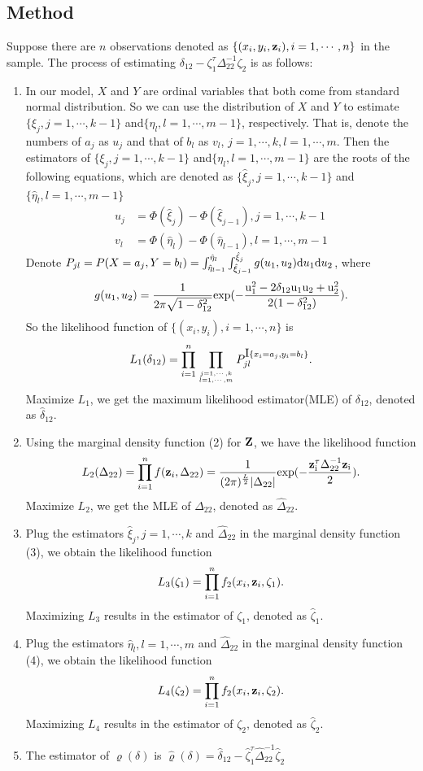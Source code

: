\documentclass[a4,11pt,epsf, amssymb]{article}
\begin{document}
\begin{CJK}{GBK}{song}
\subsection{Method}
Suppose there are $n$ observations denoted as $\{(x_i,y_i,{\bf z}_i),i=1,\cdots,n\}$ in the sample. The process of estimating $\delta_{12} - \zeta_1^\tau \Delta_{22}^{-1} \zeta_2 $ is as follows:
\begin{enumerate}
    \item In our model, $X$ and $Y$ are ordinal variables that both come from standard normal distribution. So we can use the distribution of $X$ and $Y$ to estimate $\{\xi_j,j=1,\cdots,k-1\}$ and$\{\eta_l,l=1,\cdots,m-1\}$, respectively. That is, denote the numbers of $a_j$ as $u_j$ and that of $b_l$ as $v_l$, $j = 1,\cdots,k,l=1,\cdots,m$. Then the estimators of $\{\xi_j,j=1,\cdots,k-1\}$ and$\{\eta_l,l=1,\cdots,m-1\}$ are the roots of the following equations, which are denoted as $\{\hat{\xi}_j,j=1,\cdots,k-1\}$ and$\{\hat{\eta}_l,l=1,\cdots,m-1\}$
        \begin{align*}
        u_j & = \Phi(\hat{\xi}_j) - \Phi(\hat{\xi}_{j-1}),j = 1,\cdots,k-1 \\
        v_l & = \Phi(\hat{\eta}_l) - \Phi(\hat{\eta}_{l-1}), l= 1, \cdots, m-1
        \end{align*}
        Denote $P_{jl} = P(X=a_j,Y=b_l) = \int_{\hat{\eta}_{l-1}}^{\hat{\eta}_l} \int_{\hat{\xi}_{j-1}}^{\hat{\xi}_j}g(u_1,u_2) \hbox{d}u_1 \hbox{d}u_2$, where
        $$g(u_1,u_2)=\frac 1{2\pi \sqrt{1-\delta_{12}^2}}\rm exp{(-\frac {u_1^2 - 2\delta_{12}u_1u_2 + u_2^2}{2(1-\delta_{12}^2)})}.$$
        So the likelihood function of $\{(x_i,y_i),i = 1,\cdots,n\}$ is
        $$L_1(\delta_{12}) = \prod_{i=1}^n \prod_{j=1,\cdots,k \atop l= 1,\cdots,m}P_{jl}^{\hbox {I}\{x_i = a_j, y_i = b_l\}}.$$
        Maximize $L_1$, we get the maximum likelihood estimator(MLE) of $\delta_{12}$, denoted as $\hat{\delta}_{12}.$
    \item Using the marginal density function (2) for ${\bf Z}$, we have the likelihood function
        $$L_2(\Delta_{22}) = \prod_{i=1}^n f({\bf z}_i,\Delta_{22}) = \frac 1{(2\pi)^{\frac L2}|\Delta_{22}|}\rm exp{(-\frac {{\bf z}_i^\tau \Delta_{22}^{-1}{\bf z}_i}{2})}.$$
        Maximize $L_2$, we get the MLE of $\Delta_{22}$, denoted as $\hat{\Delta}_{22}.$
    \item Plug the estimators $\hat{\xi}_j,j=1,\cdots,k$ and $\hat{\Delta}_{22}$ in the marginal density function (3), we obtain the likelihood function
        $$L_3(\zeta_1)=\prod_{i=1}^n f_2(x_i,{\bf z}_i,\zeta_1).$$
        Maximizing $L_3$ results in the estimator of $\zeta_1$, denoted as $\hat{\zeta}_1.$
    \item Plug the estimators $\hat{\eta}_l,l=1,\cdots,m$ and $\hat{\Delta}_{22}$ in the marginal density function (4), we obtain the likelihood function
        $$L_4(\zeta_2)=\prod_{i=1}^n f_2(x_i,{\bf z}_i,\zeta_2).$$
        Maximizing $L_4$ results in the estimator of $\zeta_2$, denoted as $\hat{\zeta}_2.$
    \item The estimator of $\varrho(\delta)$ is $\hat{\varrho}(\delta) = \hat{\delta}_{12} - \hat{\zeta}_1^\tau \hat{\Delta}_{22}^{-1} \hat{\zeta}_2$
\end{enumerate}


\end{CJK}
\end{document}
